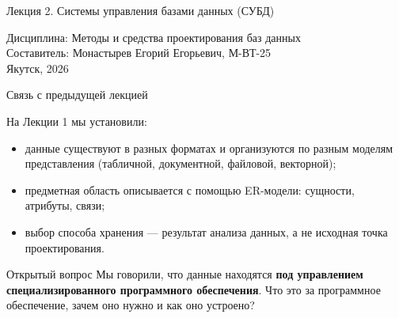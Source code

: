 \documentclass[aspectratio=169]{beamer}
\begin{document}
\begin{frame}[plain]
  \vspace*{1cm}
  \begin{center}

    \colorbox{svfuDark}{%
      \parbox[c][2.8cm][c]{0.86\paperwidth}{%
        \centering
        {\LARGE\color{white}
          Лекция 2. Системы управления базами данных (СУБД)
        }
      }%
    }

  \end{center}

  \vfill

  \centering
  {\normalsize Дисциплина: Методы и средства проектирования баз данных}\\[4pt]
  {\small
    Составитель: Монастырев Егорий Егорьевич, М-ВТ-25
  }\\[4pt]

  {\small
    Якутск, 2026
  }

  \vfill

\end{frame}


\begin{frame}{Связь с предыдущей лекцией}

На Лекции 1 мы установили:

\begin{itemize}
  \item данные существуют в разных форматах и организуются
        по разным моделям представления (табличной, документной,
        файловой, векторной);
  \item предметная область описывается с помощью ER-модели:
        сущности, атрибуты, связи;
  \item выбор способа хранения — результат анализа данных,
        а не исходная точка проектирования.
\end{itemize}

\vspace{0.4cm}

\begin{alertblock}{Открытый вопрос}
Мы говорили, что данные находятся \textbf{под управлением
специализированного программного обеспечения}.
Что это за программное обеспечение, зачем оно нужно
и как оно устроено?
\end{alertblock}

\end{frame}
\end{document}
